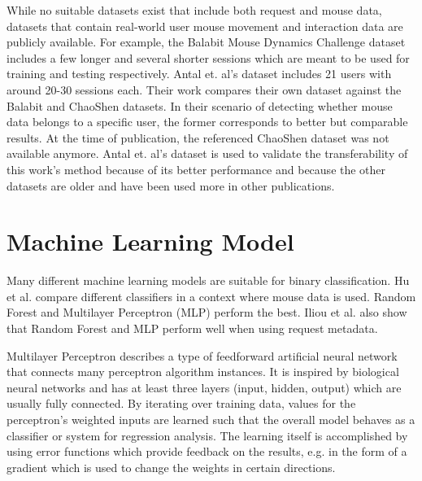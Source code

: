 \documentclass[
    fontsize=12pt,
    headings=small,
    parskip=half,           %
    bibliography=totoc,
    numbers=noenddot,       %
    open=any,               %
    final,                   %
    table
]{scrreprt}
\begin{document}
While no suitable datasets exist that include both request and mouse data, datasets that contain real-world user mouse movement and interaction data are publicly available. For example, the Balabit Mouse Dynamics Challenge dataset \cite{BALABIT_CHALLENGE} includes a few longer and several shorter sessions which are meant to be used for training and testing respectively.
Antal et. al's dataset \cite{9111596} includes 21 users with around 20-30 sessions each. Their work compares their own dataset against the Balabit and ChaoShen datasets. In their scenario of detecting whether mouse data belongs to a specific user, the former corresponds to better but comparable results.
At the time of publication, the referenced ChaoShen dataset was not available anymore. Antal et. al's dataset is used to validate the transferability of this work's method because of its better performance and because the other datasets are older and have been used more in other publications.


\section{Machine Learning Model}

Many different machine learning models are suitable for binary classification. Hu et al. \cite{8275816} compare different classifiers in a context where mouse data is used. Random Forest and Multilayer Perceptron (MLP) perform the best.
Iliou et al. \cite{10.1145/3339252.3339267} also show that Random Forest and MLP perform well when using request metadata.

Multilayer Perceptron describes a type of feedforward artificial neural network that connects many perceptron algorithm instances. It is inspired by biological neural networks and has at least three layers (input, hidden, output) which are usually fully connected. By iterating over training data, values for the perceptron's weighted inputs are learned such that the overall model behaves as a classifier or system for regression analysis. The learning itself is accomplished by using error functions which provide feedback on the results, e.g. in the form of a gradient which is used to change the weights in certain directions.
\end{document}
